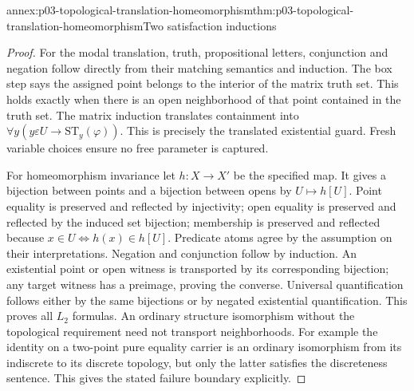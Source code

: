 \begin{annexitem}{annex:p03-topological-translation-homeomorphism}{thm:p03-topological-translation-homeomorphism}{Two satisfaction inductions}
\begin{proof}
For the modal translation, truth, propositional letters, conjunction and
negation follow directly from their matching semantics and induction.
The box step says the assigned point belongs to the interior of the
matrix truth set. This holds exactly when there is an open neighborhood
of that point contained in the truth set. The matrix induction translates
containment into \(\forall y(y\varepsilon U\to\mathrm{ST}_y(\varphi))\).
This is precisely the translated existential guard. Fresh variable choices
ensure no free parameter is captured.

For homeomorphism invariance let \(h:X\to X'\) be the specified map.
It gives a bijection between points and a bijection between opens by
\(U\mapsto h[U]\). Point equality is preserved and reflected by
injectivity; open equality is preserved and reflected by the induced
set bijection; membership is preserved and reflected because
\(x\in U\Longleftrightarrow h(x)\in h[U]\). Predicate atoms agree
by the assumption on their interpretations. Negation and conjunction
follow by induction. An existential point or open witness is transported
by its corresponding bijection; any target witness has a preimage, proving
the converse. Universal quantification follows either by the same bijections
or by negated existential quantification. This proves all \(L_2\) formulas.
An ordinary structure isomorphism without the topological requirement
need not transport neighborhoods. For example the identity on a two-point
pure equality carrier is an ordinary isomorphism from its indiscrete to
its discrete topology, but only the latter satisfies the discreteness
sentence. This gives the stated failure boundary explicitly.
\end{proof}
\end{annexitem}

